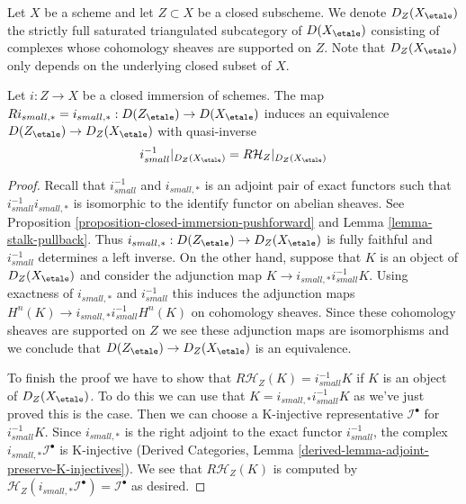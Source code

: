 \noindent
Let $X$ be a scheme and let $Z \subset X$ be a closed subscheme.
We denote $D_Z(X_\etale)$ the strictly full saturated triangulated
subcategory of $D(X_\etale)$ consisting of complexes whose cohomology
sheaves are supported on $Z$. Note that $D_Z(X_\etale)$ only
depends on the underlying closed subset of $X$.

\begin{lemma}
\label{lemma-complexes-with-support-on-closed}
Let $i : Z \to X$ be a closed immersion of schemes.
The map $Ri_{small, *} = i_{small, *} : D(Z_\etale) \to D(X_\etale)$
induces an equivalence $D(Z_\etale) \to D_Z(X_\etale)$ with quasi-inverse
$$
i_{small}^{-1}|_{D_Z(X_\etale)} = R\mathcal{H}_Z|_{D_Z(X_\etale)}
$$
\end{lemma}

\begin{proof}
Recall that $i_{small}^{-1}$ and $i_{small, *}$ is an adjoint pair of
exact functors such that $i_{small}^{-1}i_{small, *}$ is isomorphic to
the identify functor on abelian sheaves. See
Proposition \ref{proposition-closed-immersion-pushforward} and
Lemma \ref{lemma-stalk-pullback}. Thus
$i_{small, *} : D(Z_\etale) \to D_Z(X_\etale)$ is fully faithful and
$i_{small}^{-1}$ determines
a left inverse. On the other hand, suppose that $K$ is an object of
$D_Z(X_\etale)$ and consider the adjunction map
$K \to i_{small, *}i_{small}^{-1}K$.
Using exactness of $i_{small, *}$ and $i_{small}^{-1}$
this induces the adjunction maps
$H^n(K) \to i_{small, *}i_{small}^{-1}H^n(K)$ on cohomology sheaves.
Since these cohomology
sheaves are supported on $Z$ we see these adjunction maps are isomorphisms
and we conclude that $D(Z_\etale) \to D_Z(X_\etale)$ is an equivalence.

\medskip\noindent
To finish the proof we have to show that $R\mathcal{H}_Z(K) = i_{small}^{-1}K$
if $K$ is an object of $D_Z(X_\etale)$. To do this we can use that
$K = i_{small, *}i_{small}^{-1}K$
as we've just proved this is the case. Then we
can choose a K-injective representative $\mathcal{I}^\bullet$ for
$i_{small}^{-1}K$.
Since $i_{small, *}$ is the right adjoint to the exact functor
$i_{small}^{-1}$, the
complex $i_{small, *}\mathcal{I}^\bullet$ is K-injective
(Derived Categories, Lemma \ref{derived-lemma-adjoint-preserve-K-injectives}).
We see that $R\mathcal{H}_Z(K)$ is computed by
$\mathcal{H}_Z(i_{small, *}\mathcal{I}^\bullet) = \mathcal{I}^\bullet$
as desired.
\end{proof}

